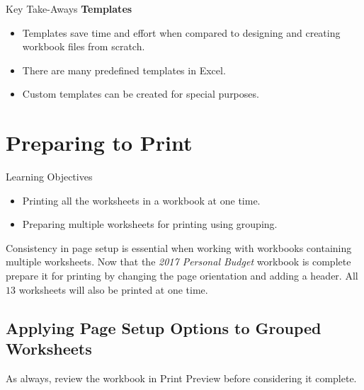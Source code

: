 \begin{center}
	\begin{tkwbox}{Key Take-Aways}
		\textbf{Templates}
		\\
		\begin{itemize}
			\setlength{\itemsep}{0pt}
			\setlength{\parskip}{0pt}
			\setlength{\parsep}{0pt}
			
			\item Templates save time and effort when compared to designing and creating workbook files from scratch.
			\item There are many predefined templates in Excel.
			\item Custom templates can be created for special purposes.
			
		\end{itemize}
	\end{tkwbox}
\end{center}

\section{Preparing to Print}

\begin{center}
	\begin{objbox}{Learning Objectives}
		\begin{itemize}
			\setlength{\itemsep}{0pt}
			\setlength{\parskip}{0pt}
			\setlength{\parsep}{0pt}
			
			\item Printing all the worksheets in a workbook at one time.
			\item Preparing multiple worksheets for printing using grouping.
			
		\end{itemize}
	\end{objbox}
\end{center}

Consistency in page setup is essential when working with workbooks containing multiple worksheets. Now that the \textit{2017 Personal Budget} workbook is complete prepare it for printing by changing the page orientation and adding a header. All $ 13 $ worksheets will also be printed at one time.

\subsection{Applying Page Setup Options to Grouped Worksheets}

As always, review the workbook in Print Preview before considering it complete.

